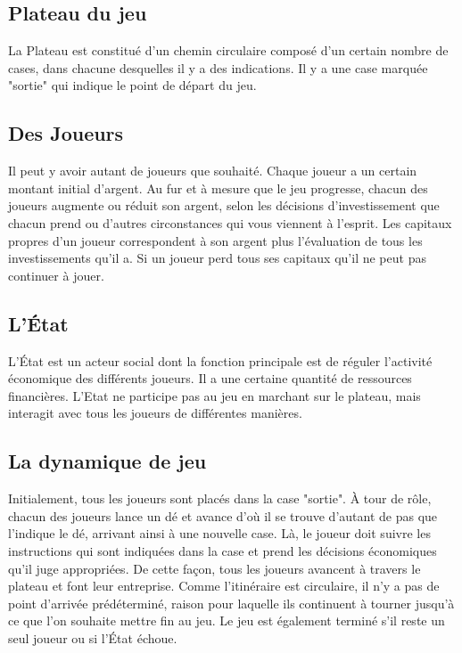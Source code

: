 \documentclass[12pt]{article}
\begin{document}
    \subsection{Plateau du jeu}
    La Plateau est constitué d'un chemin circulaire composé d'un certain nombre de cases,
dans chacune desquelles il y a des indications. Il y a une case marquée "sortie" qui
indique le point de départ du jeu.

    \subsection{Des Joueurs}
    Il peut y avoir autant de joueurs que souhaité. Chaque joueur a un certain
montant initial d'argent. Au fur et à mesure que le jeu progresse, chacun des joueurs augmente
ou réduit son argent, selon les décisions d'investissement que chacun prend ou d'autres
circonstances qui vous viennent à l’esprit. Les capitaux propres d'un joueur correspondent à
son argent plus l'évaluation de tous les investissements qu'il a. Si un joueur perd tous ses capitaux qu'il ne peut pas continuer à jouer.

    
    \subsection{L'\'Etat}
    L'\'Etat est un acteur social dont la fonction principale est de réguler l'activité économique des
différents joueurs. Il a une certaine quantité de ressources financières.  L'Etat ne participe pas
au jeu en marchant sur le plateau, mais interagit avec tous les joueurs de différentes manières.

    \subsection{La dynamique de jeu}
    Initialement, tous les joueurs sont placés dans la case "sortie". À tour de rôle, chacun
    des joueurs lance un dé et avance d'où il se trouve d'autant de pas que l'indique le
    dé, arrivant ainsi à une nouvelle case. Là, le joueur doit suivre les instructions
    qui sont indiquées dans la case et prend les décisions économiques qu'il juge appropriées.
    De cette façon, tous les joueurs avancent à travers le plateau et font leur
    entreprise. Comme l'itinéraire est circulaire, il n'y a pas de point d'arrivée prédéterminé,
    raison pour laquelle ils continuent à tourner jusqu'à ce que l'on souhaite mettre fin au jeu.
    Le jeu est également terminé s'il reste un seul joueur ou si l'État échoue.
    
\end{document}
